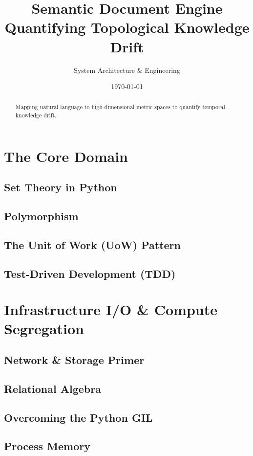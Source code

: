 \documentclass[14pt,a4paper]{extreport}
\title{\textbf{Semantic Document Engine}\\ \large Quantifying Topological Knowledge Drift}
\author{System Architecture \& Engineering}
\date{\today}
\begin{document}
\maketitle

\begin{abstract}
Mapping natural language to high-dimensional metric spaces to quantify temporal knowledge drift.
\end{abstract}

\tableofcontents



\chapter{The Core Domain}
\section{Set Theory in Python}
\section{Polymorphism}
\section{The Unit of Work (UoW) Pattern}
\section{Test-Driven Development (TDD)}

\chapter{Infrastructure I/O \& Compute Segregation}
\section{Network \& Storage Primer}
\section{Relational Algebra}
\section{Overcoming the Python GIL}
\section{Process Memory}
\end{document}

